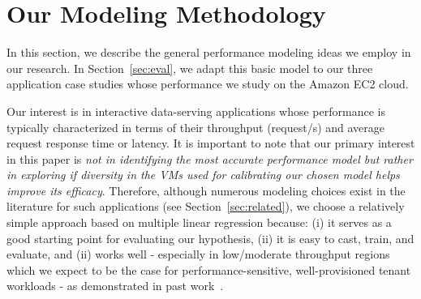 \section{Our Modeling Methodology}
\label{sec:model}
\vspace{10pt}

In this section, we describe the general performance modeling ideas we employ in our research. In Section~\ref{sec:eval}, %
we adapt this basic model to our three application case studies whose performance we study on the Amazon EC2 cloud. 

Our interest is in interactive data-serving applications whose %
performance is typically %
characterized in terms of their throughput (request/s) and average request response time or latency.  %
 It is important to note that our primary interest in this paper is {\em not in identifying the most accurate performance model but rather in exploring if diversity in the VMs used for calibrating our chosen model helps improve its efficacy}. 
Therefore, although numerous modeling choices exist in the literature for such applications (see Section~\ref{sec:related}), we choose a relatively simple approach based on multiple linear regression because: (i) it serves as a good starting point for evaluating our hypothesis, (ii) it is easy to cast, train, and evaluate, and (ii) works well - especially in low/moderate throughput regions which we expect to be the case for performance-sensitive, well-provisioned tenant workloads -  as demonstrated in past work~\cite{Stewart07,Kelly:2005:DPA:1251522.1251530}. 



